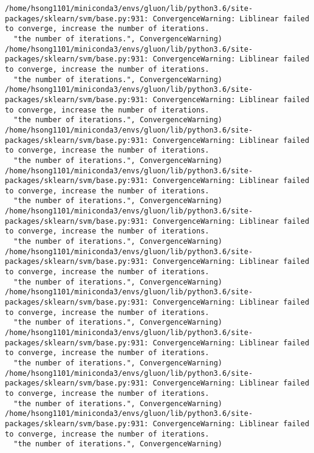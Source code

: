 \documentclass[11pt]{article}
\begin{document}
    \begin{Verbatim}[commandchars=\\\{\}]
/home/hsong1101/miniconda3/envs/gluon/lib/python3.6/site-packages/sklearn/svm/base.py:931: ConvergenceWarning: Liblinear failed to converge, increase the number of iterations.
  "the number of iterations.", ConvergenceWarning)
/home/hsong1101/miniconda3/envs/gluon/lib/python3.6/site-packages/sklearn/svm/base.py:931: ConvergenceWarning: Liblinear failed to converge, increase the number of iterations.
  "the number of iterations.", ConvergenceWarning)
/home/hsong1101/miniconda3/envs/gluon/lib/python3.6/site-packages/sklearn/svm/base.py:931: ConvergenceWarning: Liblinear failed to converge, increase the number of iterations.
  "the number of iterations.", ConvergenceWarning)
/home/hsong1101/miniconda3/envs/gluon/lib/python3.6/site-packages/sklearn/svm/base.py:931: ConvergenceWarning: Liblinear failed to converge, increase the number of iterations.
  "the number of iterations.", ConvergenceWarning)
/home/hsong1101/miniconda3/envs/gluon/lib/python3.6/site-packages/sklearn/svm/base.py:931: ConvergenceWarning: Liblinear failed to converge, increase the number of iterations.
  "the number of iterations.", ConvergenceWarning)
/home/hsong1101/miniconda3/envs/gluon/lib/python3.6/site-packages/sklearn/svm/base.py:931: ConvergenceWarning: Liblinear failed to converge, increase the number of iterations.
  "the number of iterations.", ConvergenceWarning)
/home/hsong1101/miniconda3/envs/gluon/lib/python3.6/site-packages/sklearn/svm/base.py:931: ConvergenceWarning: Liblinear failed to converge, increase the number of iterations.
  "the number of iterations.", ConvergenceWarning)
/home/hsong1101/miniconda3/envs/gluon/lib/python3.6/site-packages/sklearn/svm/base.py:931: ConvergenceWarning: Liblinear failed to converge, increase the number of iterations.
  "the number of iterations.", ConvergenceWarning)
/home/hsong1101/miniconda3/envs/gluon/lib/python3.6/site-packages/sklearn/svm/base.py:931: ConvergenceWarning: Liblinear failed to converge, increase the number of iterations.
  "the number of iterations.", ConvergenceWarning)
/home/hsong1101/miniconda3/envs/gluon/lib/python3.6/site-packages/sklearn/svm/base.py:931: ConvergenceWarning: Liblinear failed to converge, increase the number of iterations.
  "the number of iterations.", ConvergenceWarning)
/home/hsong1101/miniconda3/envs/gluon/lib/python3.6/site-packages/sklearn/svm/base.py:931: ConvergenceWarning: Liblinear failed to converge, increase the number of iterations.
  "the number of iterations.", ConvergenceWarning)

\end{Verbatim}
\end{document}
